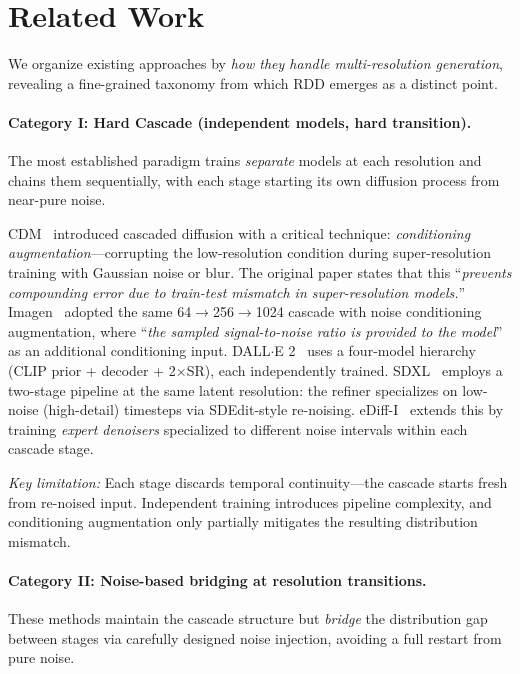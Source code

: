 \documentclass[10pt]{article}
\begin{document}
\section{Related Work}
\label{sec:related}


We organize existing approaches by \emph{how they handle multi-resolution generation}, revealing a fine-grained taxonomy from which RDD emerges as a distinct point.

\paragraph{Category I: Hard Cascade (independent models, hard transition).}
The most established paradigm trains \emph{separate} models at each resolution and chains them sequentially, with each stage starting its own diffusion process from near-pure noise.

CDM~\citep{ho2022cdm} introduced cascaded diffusion with a critical technique: \emph{conditioning augmentation}---corrupting the low-resolution condition during super-resolution training with Gaussian noise or blur.
The original paper states that this ``\emph{prevents compounding error due to train-test mismatch in super-resolution models.}''
Imagen~\citep{saharia2022imagen} adopted the same 64$\to$256$\to$1024 cascade with noise conditioning augmentation, where ``\emph{the sampled signal-to-noise ratio is provided to the model}'' as an additional conditioning input.
DALL$\cdot$E 2~\citep{ramesh2022dalle2} uses a four-model hierarchy (CLIP prior + decoder + 2$\times$SR), each independently trained.
SDXL~\citep{podell2023sdxl} employs a two-stage pipeline at the same latent resolution: the refiner specializes on low-noise (high-detail) timesteps via SDEdit-style re-noising.
eDiff-I~\citep{balaji2023ediffi} extends this by training \emph{expert denoisers} specialized to different noise intervals within each cascade stage.

\emph{Key limitation:} Each stage discards temporal continuity---the cascade starts fresh from re-noised input. Independent training introduces pipeline complexity, and conditioning augmentation only partially mitigates the resulting distribution mismatch.

\paragraph{Category II: Noise-based bridging at resolution transitions.}
These methods maintain the cascade structure but \emph{bridge} the distribution gap between stages via carefully designed noise injection, avoiding a full restart from pure noise.
\end{document}
